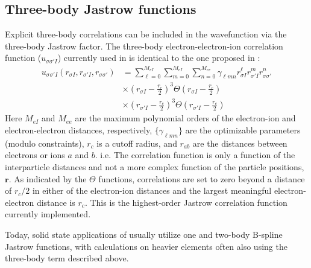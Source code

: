 % 



\subsection{Three-body Jastrow functions}
Explicit three-body correlations can be included in the wavefunction via the three-body Jastrow factor.
The three-body electron-electron-ion correlation function ($u_{\sigma\sigma'I}$) currently used in \qmcpack is identical to the one proposed in \cite{Drummond2004}:
\begin{eqnarray}
u_{\sigma\sigma'I}(r_{\sigma I},r_{\sigma'I},r_{\sigma\sigma'}) &= \sum_{\ell=0}^{M_{eI}}\sum_{m=0}^{M_{eI}}\sum_{n=0}^{M_{ee}}\gamma_{\ell mn} r_{\sigma I}^\ell r_{\sigma'I}^m r_{\sigma\sigma'}^n \\
   &\times \left(r_{\sigma I}-\frac{r_c}{2}\right)^3 \Theta\left(r_{\sigma I}-\frac{r_c}{2}\right) \nonumber \\
   &\times \left(r_{\sigma' I}-\frac{r_c}{2}\right)^3 \Theta\left(r_{\sigma' I}-\frac{r_c}{2}\right) \nonumber
\end{eqnarray}
Here $M_{eI}$ and $M_{ee}$ are the maximum polynomial orders of the
electron-ion and electron-electron distances, respectively,
$\{\gamma_{\ell mn}\}$ are the optimizable parameters (modulo
constraints), $r_c$ is a cutoff radius, and $r_{ab}$ are the distances
between electrons or ions $a$ and $b$. i.e. The correlation function
is only a function of the interparticle distances and not a more
complex function of the particle positions, $\mathbf{r}$. As indicated by the
$\Theta$ functions, correlations are set to zero beyond a distance of
$r_c/2$ in either of the electron-ion distances and the largest
meaningful electron-electron distance is $r_c$.  This is the
highest-order Jastrow correlation function currently implemented.


Today, solid state applications of \qmcpack usually utilize one and
two-body B-spline Jastrow functions, with calculations on heavier
elements often also using the three-body term described above.

